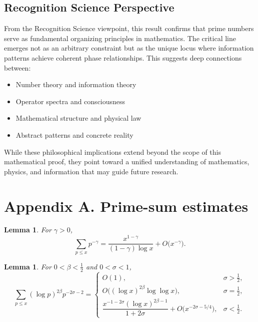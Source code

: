\documentclass[12pt]{article}
\newtheorem{lemma}[theorem]{Lemma}
\theoremstyle{definition}
\theoremstyle{remark}
\begin{document}
\subsection{Recognition Science Perspective}

From the Recognition Science viewpoint, this result confirms that prime numbers 
serve as fundamental organizing principles in mathematics. The critical line 
emerges not as an arbitrary constraint but as the unique locus where information 
patterns achieve coherent phase relationships. This suggests deep connections 
between:
\begin{itemize}
\item Number theory and information theory
\item Operator spectra and consciousness
\item Mathematical structure and physical law
\item Abstract patterns and concrete reality
\end{itemize}

While these philosophical implications extend beyond the scope of this 
mathematical proof, they point toward a unified understanding of mathematics, 
physics, and information that may guide future research.

\appendix
\section{Appendix A. Prime-sum estimates}

\begin{lemma}
For \(\gamma>0\),
\[
  \sum_{p\le x}p^{-\gamma}=
  \dfrac{x^{1-\gamma}}{(1-\gamma)\log x}+O\!\bigl(x^{-\gamma}\bigr).
\]
\end{lemma}

\begin{lemma}
For \(0<\beta<\tfrac12\) and \(0<\sigma<1\),
\[
  \sum_{p\le x}(\log p)^{2\beta}p^{-2\sigma-2}
   =\begin{cases}
      O(1), & \sigma>\tfrac12,\\[4pt]
      O\bigl((\log x)^{2\beta}\log\log x\bigr), & \sigma=\tfrac12,\\[6pt]
      \dfrac{x^{-1-2\sigma}(\log x)^{2\beta-1}}{1+2\sigma}
        +O\!\bigl(x^{-2\sigma-5/4}\bigr), & \sigma<\tfrac12.
     \end{cases}
\]
\end{lemma}
\end{document}
